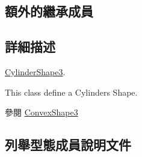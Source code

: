 \subsection*{額外的繼承成員}


\subsection{詳細描述}
\hyperlink{class_magnum_1_1_cylinder_shape3}{Cylinder\+Shape3}. 

This class define a Cylinders Shape. \begin{DoxySeeAlso}{參閱}
\hyperlink{class_magnum_1_1_convex_shape3}{Convex\+Shape3} 
\end{DoxySeeAlso}


\subsection{列舉型態成員說明文件}
